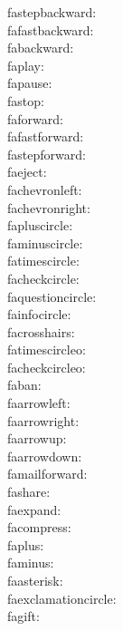 fastepbackward: {\FA \fastepbackward} \\
fafastbackward: {\FA \fafastbackward} \\
fabackward: {\FA \fabackward} \\
faplay: {\FA \faplay} \\
fapause: {\FA \fapause} \\
fastop: {\FA \fastop} \\
faforward: {\FA \faforward} \\
fafastforward: {\FA \fafastforward} \\
fastepforward: {\FA \fastepforward} \\
faeject: {\FA \faeject} \\
fachevronleft: {\FA \fachevronleft} \\
fachevronright: {\FA \fachevronright} \\
fapluscircle: {\FA \fapluscircle} \\
faminuscircle: {\FA \faminuscircle} \\
fatimescircle: {\FA \fatimescircle} \\
facheckcircle: {\FA \facheckcircle} \\
faquestioncircle: {\FA \faquestioncircle} \\
fainfocircle: {\FA \fainfocircle} \\
facrosshairs: {\FA \facrosshairs} \\
fatimescircleo: {\FA \fatimescircleo} \\
facheckcircleo: {\FA \facheckcircleo} \\
faban: {\FA \faban} \\
faarrowleft: {\FA \faarrowleft} \\
faarrowright: {\FA \faarrowright} \\
faarrowup: {\FA \faarrowup} \\
faarrowdown: {\FA \faarrowdown} \\
famailforward: {\FA \famailforward} \\
fashare: {\FA \fashare} \\
faexpand: {\FA \faexpand} \\
facompress: {\FA \facompress} \\
faplus: {\FA \faplus} \\
faminus: {\FA \faminus} \\
faasterisk: {\FA \faasterisk} \\
faexclamationcircle: {\FA \faexclamationcircle} \\
fagift: {\FA \fagift} \\
